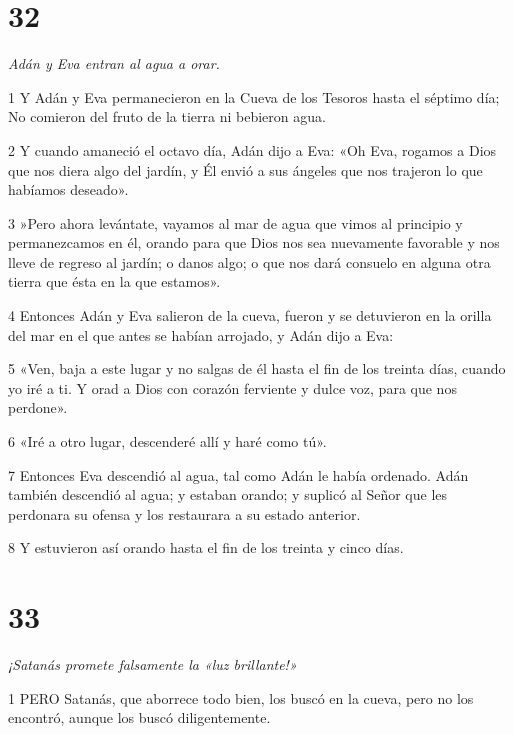 \chapter{32}

\par \textit{Adán y Eva entran al agua a orar.}

\par 1 Y Adán y Eva permanecieron en la Cueva de los Tesoros hasta el séptimo día; No comieron del fruto de la tierra ni bebieron agua.

\par 2 Y cuando amaneció el octavo día, Adán dijo a Eva: «Oh Eva, rogamos a Dios que nos diera algo del jardín, y Él envió a sus ángeles que nos trajeron lo que habíamos deseado».

\par 3 »Pero ahora levántate, vayamos al mar de agua que vimos al principio y permanezcamos en él, orando para que Dios nos sea nuevamente favorable y nos lleve de regreso al jardín; o danos algo; o que nos dará consuelo en alguna otra tierra que ésta en la que estamos».

\par 4 Entonces Adán y Eva salieron de la cueva, fueron y se detuvieron en la orilla del mar en el que antes se habían arrojado, y Adán dijo a Eva:

\par 5 «Ven, baja a este lugar y no salgas de él hasta el fin de los treinta días, cuando yo iré a ti. Y orad a Dios con corazón ferviente y dulce voz, para que nos perdone».

\par 6 «Iré a otro lugar, descenderé allí y haré como tú».

\par 7 Entonces Eva descendió al agua, tal como Adán le había ordenado. Adán también descendió al agua; y estaban orando; y suplicó al Señor que les perdonara su ofensa y los restaurara a su estado anterior.

\par 8 Y estuvieron así orando hasta el fin de los treinta y cinco días.

\chapter{33}

\par \textit{¡Satanás promete falsamente la «luz brillante!»}

\par 1 PERO Satanás, que aborrece todo bien, los buscó en la cueva, pero no los encontró, aunque los buscó diligentemente.


